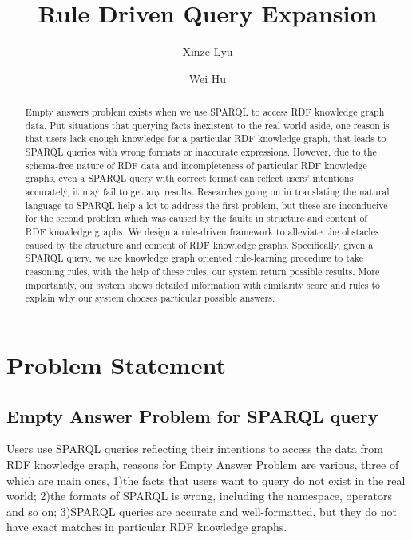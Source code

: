 \documentclass[runningheads]{llncs}
\begin{document}
%
\title{Rule Driven Query Expansion}
%
%
\author{Xinze Lyu \and
Wei Hu}
%
%
%
\maketitle              %
%
\begin{abstract}
  Empty answers problem exists when we use SPARQL to access RDF knowledge graph data. Put situations that querying facts inexistent to the real world aside, one reason is that users lack enough knowledge for a particular RDF knowledge graph, that leads to SPARQL queries with wrong formats or inaccurate expressions.  However, due to the schema-free nature of RDF data and incompleteness of particular RDF knowledge graphs, even a SPARQL query with correct format can reflect users' intentions accurately, it may fail to get any results. Researches going on in translating the natural language to SPARQL help a lot to address the first problem, but these are inconducive for the second problem which was caused by the faults in structure and content of RDF knowledge graphs.
  We design a rule-driven framework to alleviate the obstacles caused by the structure and content of RDF knowledge graphs. Specifically, given a SPARQL query, we use knowledge graph oriented rule-learning procedure to take reasoning rules, with the help of these rules, our system return possible results. More importantly, our system shows detailed information with similarity score and rules to explain why our system chooses particular possible answers.
\end{abstract}
%
%
%
\section{Problem Statement}
\subsection{Empty Answer Problem for SPARQL query}
Users use SPARQL queries reflecting their intentions to access the  data from RDF knowledge graph, reasons for Empty Answer Problem are various, three of which are main ones, 1)the facts that users want to query  do not exist in the real world; 2)the formats of SPARQL is wrong, including  the namespace, operators and so on; 3)SPARQL queries are accurate and well-formatted, but they do not have exact matches in particular RDF knowledge graphs.
\end{document}
